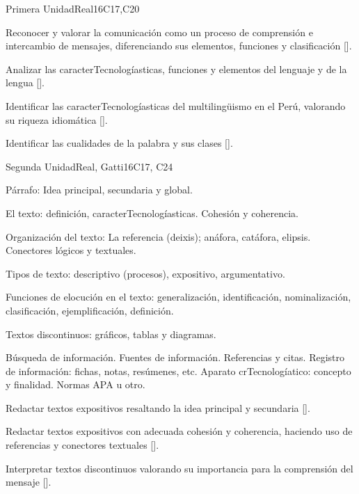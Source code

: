 \begin{syllabus}
\begin{unit}{}{Primera Unidad}{Real}{16}{C17,C20}
\begin{learningoutcomes}
   \item Reconocer y valorar la comunicación como un proceso de comprensión e intercambio de mensajes, diferenciando sus elementos, funciones y clasificación [\Usage].
   \item Analizar las caracterTecnologíasticas, funciones y elementos del lenguaje y de la lengua [\Usage].
   \item Identificar las caracterTecnologíasticas del multilingüismo en el Perú, valorando su riqueza idiomática [\Usage].
   \item Identificar las cualidades de la palabra y sus clases [\Usage].
\end{learningoutcomes}
\end{unit}

\begin{unit}{}{Segunda Unidad}{Real, Gatti}{16}{C17, C24}
\begin{topics}
   \item Párrafo: Idea principal, secundaria y global.
   \item El texto: definición, caracterTecnologíasticas. Cohesión y coherencia.
   \item Organización del texto: La referencia (deixis); anáfora, catáfora, elipsis. Conectores lógicos y textuales.
   \item Tipos de texto: descriptivo (procesos), expositivo, argumentativo.
   \item Funciones de elocución en el texto: generalización, identificación, nominalización, clasificación,  ejemplificación, definición.
   \item Textos discontinuos: gráficos, tablas y diagramas.
   \item Búsqueda de información. Fuentes de información. Referencias y citas. Registro de información: fichas, notas, resúmenes, etc. Aparato crTecnologíatico: concepto y finalidad. Normas APA u otro.
\end{topics}
\begin{learningoutcomes}
   \item Redactar textos expositivos resaltando la idea principal y secundaria [\Usage].
   \item Redactar textos expositivos con adecuada cohesión y coherencia, haciendo uso de referencias y conectores textuales [\Usage].
   \item Interpretar textos discontinuos  valorando su importancia para la comprensión del mensaje [\Usage].
\end{learningoutcomes}
\end{unit}


\end{syllabus}
